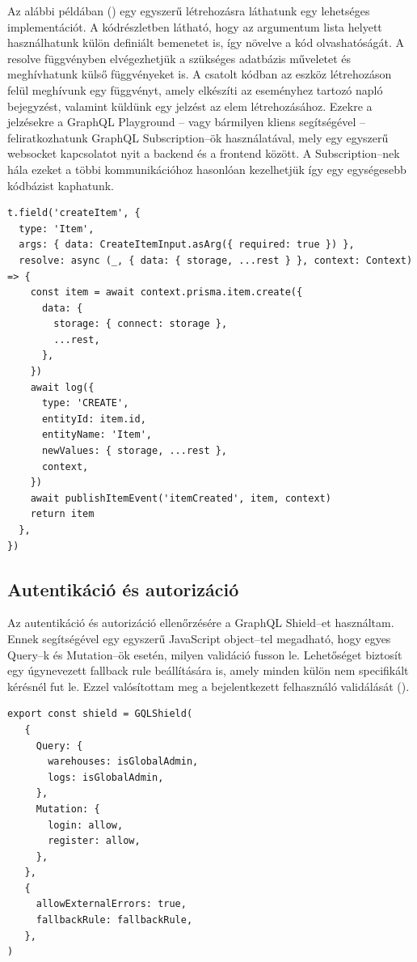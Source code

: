 Az alábbi példában () egy egyszerű létrehozásra láthatunk egy lehetséges implementációt.
A kódrészletben látható, hogy az argumentum lista helyett használhatunk külön definiált bemenetet is, így növelve a kód olvashatóságát.
A resolve függvényben elvégezhetjük a szükséges adatbázis műveletet és meghívhatunk külső függvényeket is.
A csatolt kódban az eszköz létrehozáson felül meghívunk egy függvényt, amely elkészíti az eseményhez tartozó napló bejegyzést, valamint küldünk egy jelzést az elem létrehozásához.
Ezekre a jelzésekre a GraphQL Playground – vagy bármilyen kliens segítségével – feliratkozhatunk GraphQL Subscription–ök használatával, mely egy egyszerű websocket kapcsolatot nyit a backend és a frontend között. A Subscription–nek hála ezeket a többi kommunikációhoz hasonlóan kezelhetjük így egy egységesebb kódbázist kaphatunk.


\begin{lstlisting}[style=ES6, caption={Eszköz létrehozás resolver},label={lst:resolver}]
t.field('createItem', {
  type: 'Item',
  args: { data: CreateItemInput.asArg({ required: true }) },
  resolve: async (_, { data: { storage, ...rest } }, context: Context) => {
    const item = await context.prisma.item.create({
      data: {
        storage: { connect: storage },
        ...rest,
      },
    })
    await log({
      type: 'CREATE',
      entityId: item.id,
      entityName: 'Item',
      newValues: { storage, ...rest },
      context,
    })
    await publishItemEvent('itemCreated', item, context)
    return item
  },
})
\end{lstlisting}

\subsection{Autentikáció és autorizáció}
Az autentikáció és autorizáció ellenőrzésére a GraphQL Shield–et használtam. 
Ennek segítségével egy egyszerű JavaScript object–tel megadható, hogy egyes Query–k és Mutation–ök esetén, milyen validáció fusson le.
Lehetőséget biztosít egy úgynevezett fallback rule beállítására is, amely minden külön nem specifikált kérésnél fut le.
Ezzel valósítottam meg a bejelentkezett felhasználó validálását ().

\begin{lstlisting}[style=ES6, caption={GraphQL Shield},label={lst:shield}]
export const shield = GQLShield(
   {
     Query: {
       warehouses: isGlobalAdmin,
       logs: isGlobalAdmin,
     },
     Mutation: {
       login: allow,
       register: allow,
     },
   },
   {
     allowExternalErrors: true,
     fallbackRule: fallbackRule,
   },
)
\end{lstlisting}


